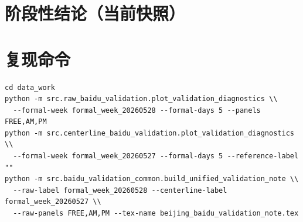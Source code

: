 \documentclass[12pt]{article}
\begin{document}
\section*{阶段性结论（当前快照）}


\section*{复现命令}

\begin{verbatim}
cd data_work
python -m src.raw_baidu_validation.plot_validation_diagnostics \\
  --formal-week formal_week_20260528 --formal-days 5 --panels FREE,AM,PM
python -m src.centerline_baidu_validation.plot_validation_diagnostics \\
  --formal-week formal_week_20260527 --formal-days 5 --reference-label ""
python -m src.baidu_validation_common.build_unified_validation_note \\
  --raw-label formal_week_20260528 --centerline-label formal_week_20260527 \\
  --raw-panels FREE,AM,PM --tex-name beijing_baidu_validation_note.tex
\end{verbatim}
\end{document}
